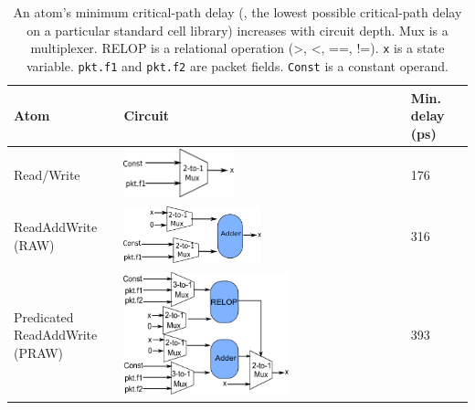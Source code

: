 \begin{table}[!t]
  \centering
  \begin{small}
    \begin{tabular}{|p{}|p{}|p{}|}
  \hline
  Atom & Circuit & Min. delay (ps) \\
  \hline
  Read/Write & \centering\includegraphics[width=0.4\textwidth]{domino_rw.pdf} & 176 \\
  \hline
  ReadAddWrite (RAW) & \centering\includegraphics[width=0.5\textwidth]{domino_raw.pdf} & 316\\
  \hline
  \pbox{0.1\textwidth}
  {Predicated\\
  ReadAddWrite (PRAW)} & \centering\includegraphics[width=0.6\textwidth]{domino_pred_raw.pdf}  & 393 \\
  \hline
  \end{tabular}
\end{small}
\caption{An atom's minimum critical-path delay (\ie, the lowest possible
critical-path delay on a particular standard cell library) increases with
circuit depth.  Mux is a multiplexer. RELOP is a relational operation (>, <,
==, !=). {\tt x} is a state variable. {\tt pkt.f1} and {\tt pkt.f2} are packet
fields. {\tt Const} is a constant operand.}
\label{tab:circuits}
\end{table}



